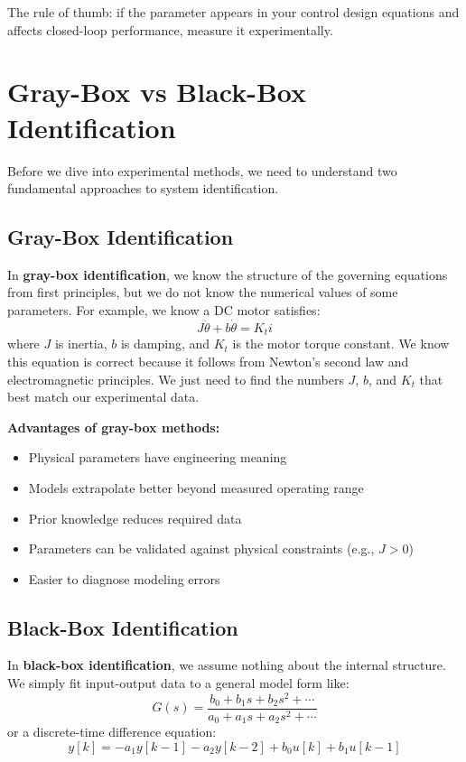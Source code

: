 The rule of thumb: if the parameter appears in your control design equations and affects closed-loop performance, measure it experimentally.

\section{Gray-Box vs Black-Box Identification}

Before we dive into experimental methods, we need to understand two fundamental approaches to system identification.

\subsection{Gray-Box Identification}

In \textbf{gray-box identification}, we know the structure of the governing equations from first principles, but we do not know the numerical values of some parameters. For example, we know a DC motor satisfies:
\begin{equation}
J\ddot{\theta} + b\dot{\theta} = K_t i
\end{equation}
where $J$ is inertia, $b$ is damping, and $K_t$ is the motor torque constant. We know this equation is correct because it follows from Newton's second law and electromagnetic principles. We just need to find the numbers $J$, $b$, and $K_t$ that best match our experimental data.

\textbf{Advantages of gray-box methods:}
\begin{itemize}
    \item Physical parameters have engineering meaning
    \item Models extrapolate better beyond measured operating range
    \item Prior knowledge reduces required data
    \item Parameters can be validated against physical constraints (e.g., $J > 0$)
    \item Easier to diagnose modeling errors
\end{itemize}

\subsection{Black-Box Identification}

In \textbf{black-box identification}, we assume nothing about the internal structure. We simply fit input-output data to a general model form like:
\begin{equation}
G(s) = \frac{b_0 + b_1 s + b_2 s^2 + \cdots}{a_0 + a_1 s + a_2 s^2 + \cdots}
\end{equation}
or a discrete-time difference equation:
\begin{equation}
y[k] = -a_1 y[k-1] - a_2 y[k-2] + b_0 u[k] + b_1 u[k-1]
\end{equation}

